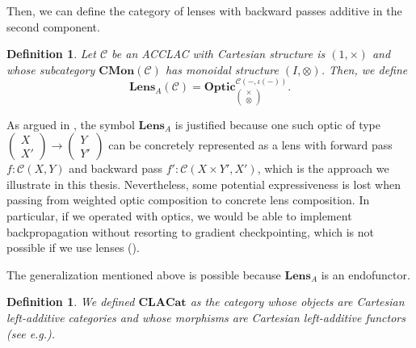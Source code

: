 \documentclass[11pt,a4paper,openright,twoside]{report}
\newcounter{mycounter}
\theoremstyle{plain}
\newtheorem{definition}[mycounter]{Definition}
\theoremstyle{definition}
\begin{document}
Then, we can define the category of lenses with backward passes additive in the second component.

\begin{definition}
  Let $\mathcal{C}$ be an ACCLAC with Cartesian structure is $(1, \times)$ and whose subcategory $\mathbf{CMon}(\mathcal{C})$ has monoidal structure $(I, \otimes)$. Then, we define
  \[\mathbf{Lens}_A(\mathcal{C}) = \mathbf{Optic}_{\left(\begin{smallmatrix}\times \\ \otimes\end{smallmatrix}\right)}^{\mathcal{C}(-,\iota(-))}.\]
\end{definition}

As argued in \cite{gavranovic2024fundamental}, the symbol $\mathbf{Lens}_A$ is justified because one such optic of type $\left(\begin{smallmatrix}X \\ X'\end{smallmatrix}\right) \to \left(\begin{smallmatrix}Y \\ Y'\end{smallmatrix}\right)$ can be concretely represented as a lens with forward pass $f : \mathcal{C}(X,Y)$ and backward pass $f' : \mathcal{C}(X \times Y',X')$, which is the approach we illustrate in this thesis.  Nevertheless, some potential expressiveness is lost when passing from weighted optic composition to concrete lens composition. In particular, if we operated with optics, we would be able to implement backpropagation without resorting to gradient checkpointing, which is not possible if we use lenses (\cite{gavranovic2024fundamental}). 

The generalization mentioned above is possible because $\mathbf{Lens}_A$ is an endofunctor.

\begin{definition}
  We defined $\mathbf{CLACat}$ as the category whose objects are Cartesian left-additive categories and whose morphisms are Cartesian left-additive functors (see e.g.\cite{blute2006differential}).
\end{definition}
\end{document}
